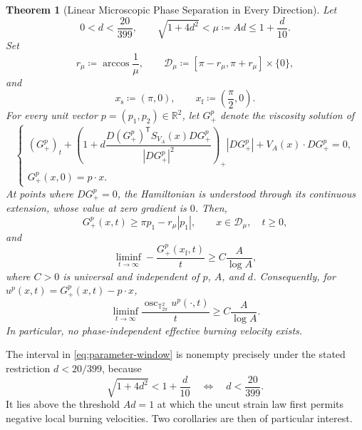 \documentclass[11pt,reqno,noamsfonts]{amsart}
\newtheorem{theorem}{Theorem}[section]
\theoremstyle{definition}
\theoremstyle{remark}
\newcommand{\T}{\mathbb T}
\newcommand{\osc}{\operatorname{osc}}
\begin{document}
\begin{theorem}[Linear Microscopic Phase Separation in Every Direction]
\label{thm:main}
Let
\begin{equation}\label{eq:parameter-window}
  0<d<\frac{20}{399},
  \qquad
  \sqrt{1+4d^2}<\mu\coloneqq Ad\le1+\frac d{10}.
\end{equation}
Set
\[
  r_\mu\coloneqq\arccos\frac1\mu,
  \qquad
  \mathcal D_\mu
  \coloneqq[\pi-r_\mu,\pi+r_\mu]\times\{0\},
\]
and
\[
  x_{\mathrm s}\coloneqq(\pi,0),
  \qquad
  x_{\mathrm f}\coloneqq\left(\frac\pi2,0\right).
\]
For every unit vector $p=(p_1,p_2)\in\mathbb R^2$, let $G_+^p$ denote
the viscosity solution of
\begin{equation}\label{eq:cutoff-main}
\begin{cases}
(G_+^p)_t+
\left(
  1+d\dfrac{D(G_+^p)^{\mathsf T}
  S_{V_A}(x)D G_+^p}{|D G_+^p|^2}
\right)_+
|D G_+^p|
+V_A(x)\cdot D G_+^p=0,\\[0.4em]
G_+^p(x,0)=p\cdot x.
\end{cases}
\end{equation}
At points where $D G_+^p=0$, the Hamiltonian is understood through its
continuous extension, whose value at zero gradient is $0$.  Then,
\begin{equation}\label{eq:slow-main}
  G_+^p(x,t)
  \ge \pi p_1-r_\mu|p_1|,
  \qquad
  x\in\mathcal D_\mu,
  \quad t\ge0,
\end{equation}
and
\begin{equation}\label{eq:fast-main}
  \liminf_{t\to\infty}
  -\frac{G_+^p(x_{\mathrm f},t)}t
  \ge C\frac A{\log A},
\end{equation}
where $C>0$ is universal and independent of $p$, $A$, and $d$.
Consequently, for
$u^p(x,t)=G_+^p(x,t)-p\cdot x$,
\begin{equation}\label{eq:oscillation-main}
  \liminf_{t\to\infty}
  \frac{\osc_{\T^2_{2\pi}}u^p(\cdot,t)}t
  \ge C\frac A{\log A}.
\end{equation}
In particular, no phase-independent effective burning velocity exists.
\end{theorem}

The interval in \eqref{eq:parameter-window} is nonempty precisely under
the stated restriction $d<20/399$, because
\[
  \sqrt{1+4d^2}<1+\frac d{10}
  \quad\Longleftrightarrow\quad
  d<\frac{20}{399}.
\]
It lies above the threshold $Ad=1$ at which the uncut strain law first
permits negative local burning velocities. Two corollaries are then of particular interest.
\end{document}

